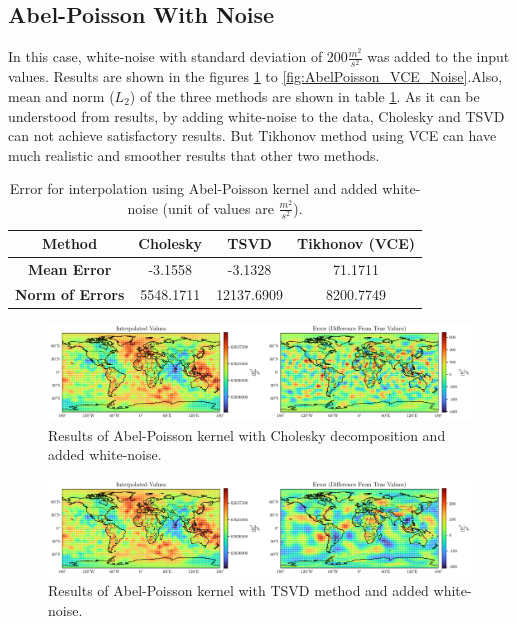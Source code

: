 \documentclass[12pt]{article}
\begin{document}
	
	\subsection{Abel-Poisson With Noise}
	
	In this case, white-noise with standard deviation of $200 \frac{m^2}{s^2}$ was added to the input values. Results are shown in the figures \ref{fig:AbelPoisson_Chol_Noise} to \ref{fig:AbelPoisson_VCE_Noise}.Also, mean and norm ($L_2$) of the three methods are shown in table \ref{tab:AbelPoisson_Error_Noise}.
	As it can be understood from results, by adding white-noise to the data, Cholesky and TSVD can not achieve satisfactory results. But Tikhonov method using VCE can have much realistic and smoother results that other two methods. 
	
	\begin{table}[h!]
		\centering
		\caption{Error for interpolation using Abel-Poisson kernel and added white-noise (unit of values are $\frac{m^2}{s^2}$).}
		\vspace{0.3cm}
		\renewcommand{\arraystretch}{1.4}
		\begin{tabular}{c|c|c|c}
			\textbf{Method} & Cholesky & TSVD & Tikhonov (VCE) \\
			\hline 
			\textbf{Mean Error} & -3.1558 & -3.1328 & 71.1711 \\
			\hline 
			\textbf{Norm of Errors} & 5548.1711 & 12137.6909 & 8200.7749 \\
		\end{tabular}
		\label{tab:AbelPoisson_Error_Noise}
	\end{table}

	\begin{figure}[h!]
		\centering
		\includegraphics[width=16cm]{../Outputs/AbelPoisson_Cholesky_Noise.pdf}
		\caption{Results of Abel-Poisson kernel with Cholesky decomposition and added white-noise.}
		\label{fig:AbelPoisson_Chol_Noise}
	\end{figure}
	
	\clearpage
	
	\begin{figure}[h!]
		\centering
		\includegraphics[width=16cm]{../Outputs/AbelPoisson_TSVD_Noise.pdf}
		\caption{Results of Abel-Poisson kernel with TSVD method and added white-noise.}
		\label{fig:AbelPoisson_TSVD_Noise}
	\end{figure}
	
\end{document}
